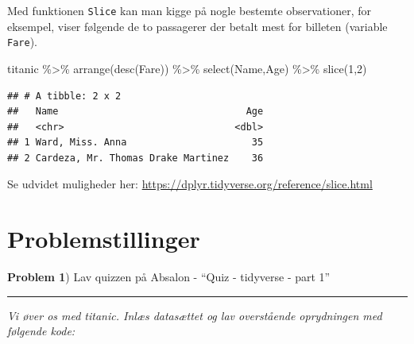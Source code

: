 \documentclass[
]{book}
\newenvironment{Shaded}{\begin{snugshade}}{\end{snugshade}}
\newcommand{\DecValTok}[1]{\textcolor[rgb]{0.00,0.00,0.81}{#1}}
\newcommand{\FunctionTok}[1]{\textcolor[rgb]{0.00,0.00,0.00}{#1}}
\newcommand{\NormalTok}[1]{#1}
\newcommand{\SpecialCharTok}[1]{\textcolor[rgb]{0.00,0.00,0.00}{#1}}
\begin{document}
Med funktionen \texttt{Slice} kan man kigge på nogle bestemte observationer, for eksempel, viser følgende de to passagerer der betalt mest for billeten (variable \texttt{Fare}).

\begin{Shaded}
\begin{Highlighting}[]
\NormalTok{titanic }\SpecialCharTok{\%\textgreater{}\%} 
  \FunctionTok{arrange}\NormalTok{(}\FunctionTok{desc}\NormalTok{(Fare)) }\SpecialCharTok{\%\textgreater{}\%}
  \FunctionTok{select}\NormalTok{(Name,Age) }\SpecialCharTok{\%\textgreater{}\%} 
  \FunctionTok{slice}\NormalTok{(}\DecValTok{1}\NormalTok{,}\DecValTok{2}\NormalTok{)}
\end{Highlighting}
\end{Shaded}

\begin{verbatim}
## # A tibble: 2 x 2
##   Name                                 Age
##   <chr>                              <dbl>
## 1 Ward, Miss. Anna                      35
## 2 Cardeza, Mr. Thomas Drake Martinez    36
\end{verbatim}

Se udvidet muligheder her: \url{https://dplyr.tidyverse.org/reference/slice.html}

\hypertarget{problemstillinger-4}{%
\section{Problemstillinger}\label{problemstillinger-4}}

\textbf{Problem 1}) Lav quizzen på Absalon - ``Quiz - tidyverse - part 1''

\begin{center}\rule{0.5\linewidth}{0.5pt}\end{center}

\emph{Vi øver os med titanic. Inlæs datasættet og lav overstående oprydningen med følgende kode:}
\end{document}
